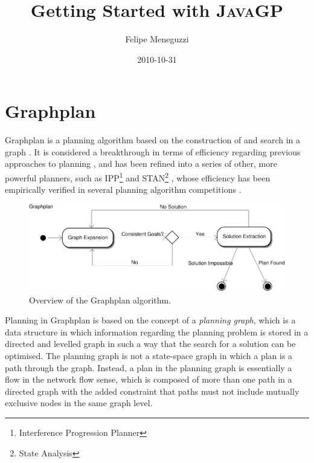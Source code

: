 \documentclass[]{article}
\title{Getting Started with \textsc{JavaGP}}
\author{Felipe Meneguzzi}
\date{2010-10-31}
\begin{document}
\ifpdf
{}
\else
{}
\fi

\maketitle


\section{Graphplan}

Graphplan is a planning algorithm based on the construction of and search in a graph \cite{Blum1997}. 
It is considered a breakthrough in terms of efficiency regarding previous approaches to planning \cite{Weld1999, Hoffmann2001}, and has been refined into a series of other, more powerful planners, such as IPP\footnote{Interference Progression Planner} \cite{Koehler1997} and STAN\footnote{State Analysis} \cite{Long1999}, whose efficiency has been empirically verified in several planning algorithm competitions \cite{Long2000,Ghallab2002}.

\begin{figure}[ht]
	\centering
	\includegraphics[width=.8\textwidth]{graphplan.pdf}
	\caption{Overview of the Graphplan algorithm.}
	\label{fig:graphplan}
\end{figure}

Planning in Graphplan is based on the concept of a \emph{planning graph}, which is a data structure in which information regarding the planning problem is stored in a directed and levelled graph in such a way that the search for a solution can be optimised. 
The planning graph is not a state-space graph in which a plan is a path through the graph. 
Instead, a plan in the planning graph is essentially a flow in the network flow sense, which is composed of more than one path in a directed graph with the added constraint that paths must not include mutually exclusive nodes in the same graph level.
\end{document}
